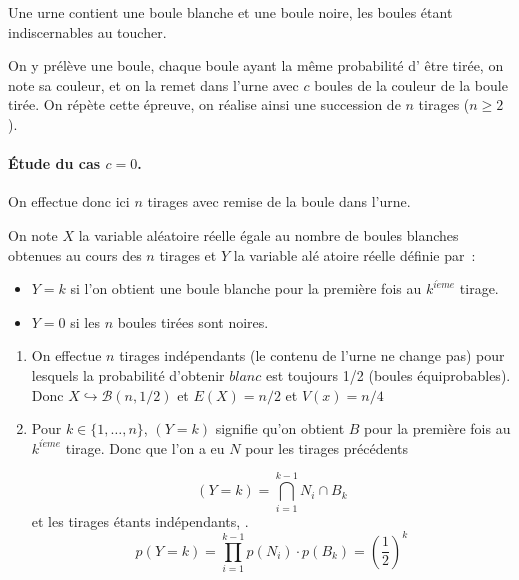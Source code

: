\begin{correction}


Une urne contient une boule blanche et une boule noire, les boules \'etant
indiscernables au toucher.

On y pr\'el\`eve une boule, chaque boule ayant la m\^{e}me probabilit\'e d'%
\^{e}tre tir\'ee, on note sa couleur, et on la remet dans l'urne avec $c$
boules de la couleur de la boule tir\'ee. On r\'ep\`ete cette \'epreuve, on
r\'ealise ainsi une succession de $n$ tirages ($n\geqslant 2$).

\paragraph{\'Etude du cas $c=0$.}

On effectue donc ici $n$ tirages avec remise de la boule dans l'urne.

On note $X$ la variable al\'{e}atoire r\'{e}elle \'{e}gale au nombre de
boules blanches obtenues au cours des $n$ tirages et $Y$ la variable al\'{e}%
atoire r\'{e}elle d\'{e}finie par~:

\begin{itemize}
\item $Y=k$ si l'on obtient une boule blanche pour la premi\`{e}re fois au $%
k^{i\grave{e}me}$ tirage.

\item $Y=0$ si les $n$ boules tir\'{e}es sont noires.
\end{itemize}

\begin{enumerate}
\item On effectue $n$ tirages ind\'{e}pendants (le contenu de l'urne ne
change pas) pour lesquels la probabilit\'{e} d'obtenir $blanc$ est toujours
1/2 (boules \'{e}quiprobables). Donc $X\hookrightarrow \mathcal{B}\left(
n,1/2\right) $ et $E\left( X\right) =n/2$ et $V\left( x\right) =n/4$

\item Pour $k\in \{1,\ldots ,n\}$, $\left( Y=k\right) $ signifie qu'on
obtient $B$ pour la premi\`{e}re fois au $k^{i\grave{e}me}$ tirage. Donc que
l'on a eu $N$ pour les tirages pr\'{e}c\'{e}dents

\begin{equation*}
\left( Y=k\right) =\bigcap_{i=1}^{k-1}N_{i}\cap B_{k}
\end{equation*}
et les tirages \'{e}tants ind\'{e}pendants, . 
\begin{equation*}
p\left( Y=k\right) =\prod_{i=1}^{k-1}p\left( N_{i}\right) \cdot p\left(
B_{k}\right) =\left( \frac{1}{2}\right) ^{k}
\end{equation*}


\end{enumerate}
\end{correction}

